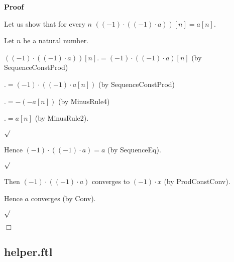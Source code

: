 \documentclass{article}
\newenvironment{forthel}{\begin{leftbar}}{\end{leftbar}}
\newenvironment{proof}{\noindent\textbf{Proof\ }}{\hspace*{\fill}$\Box$\medskip}
\newenvironment{subproof}{\begin{list}{}{}
		\item[\text{Proof}]}{\hfill $\surd$ \end{list}}
\newcommand{\cdottwo}{\cdot}
\begin{document}
\begin{forthel}
\begin{proof}
\begin{subproof}
			\begin{subproof}
				Let us show that for every $n$ $((-1) \cdottwo ((-1) \cdottwo a))[n] = a[n]$.
				
				\begin{subproof}
					Let $n$ be a natural number.
					
					$((-1) \cdottwo ((-1) \cdottwo a))[n] .= (-1) \cdot ((-1) \cdottwo a)[n]$ (by SequenceConstProd)
					
					$.= (-1) \cdot ((-1) \cdot a[n])$ (by SequenceConstProd)
					
					$.= -(-a[n])$ (by MinusRule4)
					
					$.= a[n]$ (by MinusRule2).
										
				\end{subproof}
				
				Hence $(-1) \cdottwo ((-1) \cdottwo a) = a$ (by SequenceEq).
				
			\end{subproof}
			
			Then $(-1) \cdottwo ((-1) \cdottwo a)$ converges to $(-1) \cdot x$ (by ProdConstConv).
			
			Hence $a$ converges (by Conv).
			
		\end{subproof}
		
	\end{proof}


\end{forthel}

\subsection{helper.ftl}
\end{document}
